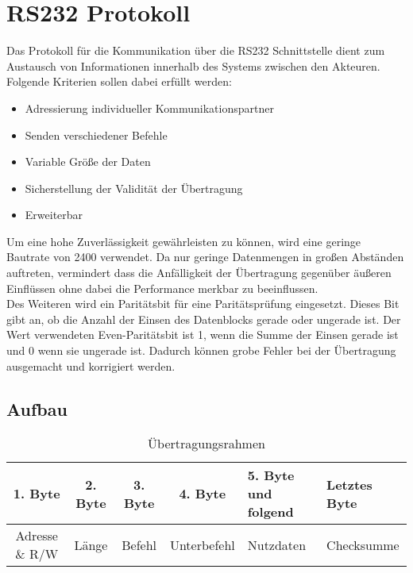 \section{RS232 Protokoll}
\label{section_RS232_Protokoll}
Das Protokoll für die Kommunikation über die RS232 Schnittstelle dient zum Austausch von Informationen innerhalb des Systems zwischen den Akteuren. \\

Folgende Kriterien sollen dabei erfüllt werden:
\begin{itemize}
\item Adressierung individueller Kommunikationspartner
\item Senden verschiedener Befehle
\item Variable Größe der Daten
\item Sicherstellung der Validität der Übertragung
\item Erweiterbar
\end{itemize}



Um eine hohe Zuverlässigkeit gewährleisten zu können, wird eine geringe Bautrate von 2400 verwendet. Da nur geringe Datenmengen in großen Abständen auftreten, vermindert dass die Anfälligkeit der Übertragung gegenüber äußeren Einflüssen ohne dabei die Performance merkbar zu beeinflussen.\\
Des Weiteren wird ein Paritätsbit für eine Paritätsprüfung eingesetzt. Dieses Bit gibt an, ob die Anzahl der Einsen des Datenblocks gerade oder ungerade ist. Der Wert verwendeten Even-Paritätsbit ist 1, wenn die Summe der Einsen gerade ist und 0 wenn sie ungerade ist. Dadurch können grobe Fehler bei der Übertragung ausgemacht und korrigiert werden.
\newpage
\subsection{Aufbau}
\begin{table}[H]
\begin{center}
\begin{tabularx}{\textwidth}{|c|c|c|c|X|X|}\hline
 1. Byte & 2. Byte & 3. Byte & 4. Byte & 5. Byte und folgend & Letztes Byte\\ \hline
  Adresse \& R/W & Länge & Befehl & Unterbefehl & Nutzdaten & Checksumme\\ \hline
\end{tabularx}
\caption{Übertragungsrahmen}
\label{table_Frame}
\end{center}
\end{table}

